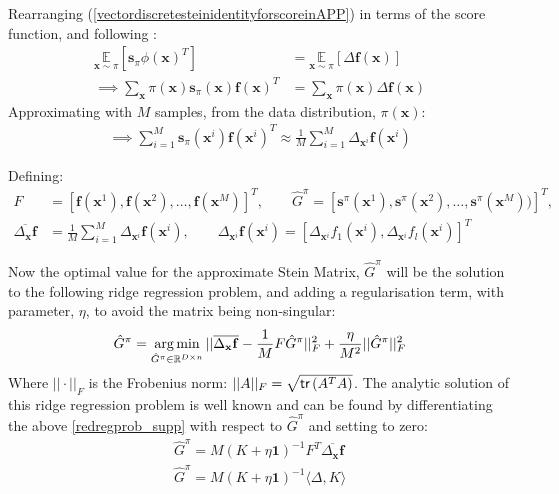 Rearranging (\ref{vectordiscretesteinidentityforscoreinAPP}) in terms of the score function, and following :
\begin{align}
    \underset{\mathbf{x}\sim \pi}{\mathbb{E}}[\mathbf{s}_\pi\phi(\mathbf{x})^T] &= \underset{\mathbf{x}\sim \pi}{\mathbb{E}} [\Delta \mathbf{f}(\mathbf{x})] \\
    \implies \sum\limits_{\mathbf{x}}\pi(\mathbf{x})\mathbf{s}_\pi(\mathbf{x})\mathbf{f}(\mathbf{x})^T &= \sum\limits_{\mathbf{x}}\pi(\mathbf{x})\Delta \mathbf{f}(\mathbf{x})
\end{align}
Approximating with $M$ samples, from the data distribution, $\pi(\mathbf{x})$:
\begin{align}
 \implies \sum\limits_{i=1}^{M}\mathbf{s}_\pi(\mathbf{x}^i)\mathbf{f}(\mathbf{x}^i)^T \approx \frac{1}{M}\sum\limits_{i=1}^{M}\Delta_{\mathbf{x}^i} \mathbf{f}(\mathbf{x}^i)
\end{align}

Defining:
\begin{align}
   F &= [\mathbf{f}(\mathbf{x}^1), \mathbf{f}(\mathbf{x}^2), \dots, \mathbf{f}(\mathbf{x}^M)]^T,\qquad
   \hat{G}^\pi = [\mathbf{s}^\pi(\mathbf{x}^1), \mathbf{s}^\pi(\mathbf{x}^2), \dots, \mathbf{s}^\pi(\mathbf{x}^M))]^T,\\
\overline{\Delta_{\mathbf{x}}\mathbf{f}} &= \frac{1}{M}\sum_{i=1}^M \Delta_{\mathbf{x}^i}\mathbf{f}(\mathbf{x}^i), \qquad \Delta_{\mathbf{x}^i}\mathbf{f}(\mathbf{x}^i) =  [\Delta_{\mathbf{x}^i}f_1(\mathbf{x}^i),\Delta_{\mathbf{x}^i}f_l(\mathbf{x}^i)]^T
\end{align}

Now the optimal value for the approximate Stein Matrix, $\hat{G}^\pi$ will be the solution to the following ridge regression problem, and adding a regularisation term, with parameter, $\eta$, to avoid the matrix being non-singular:
\begin{align}
    \hat{G}^{\pi} = \operatorname*{arg\,min}_{\hat{G}^{\pi} \in \mathbb{R}^{D\times n}}||\overline{\Delta_{\mathbf{x}}\mathbf{f}} - \frac{1}{M}F\hat{G}^{\pi}||_F^2 + \frac{\eta}{M^2}||\hat{G}^{\pi}||_F^2 \label{redregprob_supp}
\end{align}
Where $||\cdot||_F$ is the Frobenius norm: $||A||_F = \sqrt{\textsf{tr}\left(A^TA\right)}$.
The analytic solution of this ridge regression problem is well known and can be found by differentiating the above \eqref{redregprob_supp} with respect to $\hat{G}^{\pi}$ and setting to zero:
\begin{align}
    \hat{G}^{\pi} =  M(K+\eta\mathbf{1})^{-1}F^T\overline{\Delta_{\mathbf{x}}\mathbf{f}}\\
    \hat{G}^{\pi} =  M(K+\eta\mathbf{1})^{-1}\langle\Delta, K\rangle \label{approxscore_liderivation}
\end{align}

